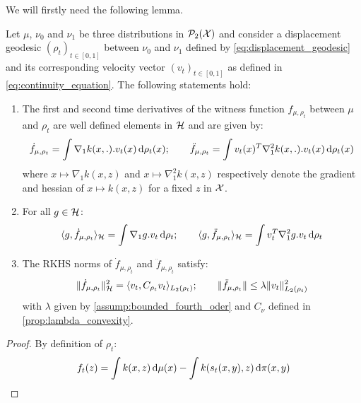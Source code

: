 We will firstly need the following lemma.

\begin{lemma}\label{lem:derivatives_witness}
	Let  $\mu$, $\nu_0$ and $\nu_1$ be three distributions in $\mathcal{P}_2({{\mathcal X}})$ and consider a displacement geodesic $(\rho_t)_{t\in[0,1]}$ between $\nu_0$ and $\nu_1$  defined by \cref{eq:displacement_geodesic} 
	and its corresponding velocity vector $(v_t)_{t\in [0,1]}$ as defined in \cref{eq:continuity_equation}. The following statements hold:
	\begin{enumerate}
		\item The first and second time derivatives of the witness function $f_{\mu,\rho_t}$ between $\mu$ and $\rho_t$ are well defined elements in $ {{\mathcal H}}$ and are given by:
		\begin{align}\label{eq:derivatives_witness}
		\dot{f}_{\mu,\rho_t} = \int \nabla_1 k(x,.).v_t(x) \mathop{}\!\mathrm{d} \rho_t(x); \qquad
		\ddot{f}_{\mu,\rho_t} = \int v_t(x)^T\nabla_1^2 k(x,.).v_t(x) \mathop{}\!\mathrm{d} \rho_t(x)
		\end{align}
		where $ x \mapsto \nabla_1 k(x,z)$ and $x\mapsto \nabla_1^2 k(x,z)$ respectively denote the gradient and hessian of $x\mapsto k(x,z)$ for a fixed $z$ in ${{\mathcal X}}$.
		\item For all $g\in {{\mathcal H}}$:
		\begin{align}\label{eq:inner_prod_deriative_witness}
		\langle g,\dot{f}_{\mu,\rho_t}\rangle_{{{\mathcal H}}} = \int \nabla_1 g.v_t \mathop{}\!\mathrm{d} \rho_t; \qquad
		\langle g,  \ddot{f}_{\mu,\rho_t}\rangle_{{{\mathcal H}}} = \int v_t^T\nabla_1^2 g.v_t \mathop{}\!\mathrm{d} \rho_t
		\end{align}
		\item The RKHS norms of $\dot{f}_{\mu,\rho_t}$ and $\ddot{f}_{\mu,\rho_t}$ satisfy:
		\begin{align}\label{eq:norm_derivative_witness}
		\Vert \dot{f}_{\mu,\rho_t}\Vert_{{{\mathcal H}}}^2 = \langle v_t,C_{\rho_t} v_t \rangle_{L_2(\rho_t)}; \qquad  \Vert \ddot{f}_{\mu,\rho_t} \Vert\leq \lambda \Vert v_t \Vert^2_{L_2(\rho_t)}  
		\end{align}
		with $\lambda$ given by \cref{assump:bounded_fourth_oder} and $C_{\nu}$ defined in \cref{prop:lambda_convexity}. 
	\end{enumerate} 
\end{lemma}
\begin{proof}
	By definition of $\rho_{t}$:
	\[
	f_t(z)= \int k(x,z)\mathop{}\!\mathrm{d} \mu(x) - \int k(s_t(x,y),z)\mathop{}\!\mathrm{d} \pi(x,y)
	\]
\end{proof}


